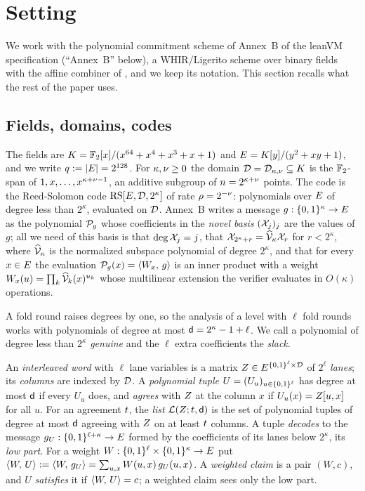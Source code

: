 \section{Setting}\label{sec:setting}

We work with the polynomial commitment scheme of Annex~B of the leanVM specification \cite{leanvm} (``Annex~B'' below), a WHIR/Ligerito scheme \cite{ACFY25,NA25} over binary fields with the affine combiner of \cite{CWYZ26}, and we keep its notation. This section recalls what the rest of the paper uses.

\subsection{Fields, domains, codes}\label{sec:fields}

The fields are $K=\mathbb{F}_2[x]/(x^{64}+x^4+x^3+x+1)$ and $E=K[y]/(y^2+xy+1)$, and we write $q:=|E|=2^{128}$. For $\kappa,\nu\ge0$ the domain $\mathcal{D}=\mathcal{D}_{\kappa,\nu}\subseteq K$ is the $\mathbb{F}_2$-span of $1,x,\dots,x^{\kappa+\nu-1}$, an additive subgroup of $n=2^{\kappa+\nu}$ points. The code is the Reed-Solomon code $\mathrm{RS}[E,\mathcal{D},2^\kappa]$ of rate $\rho=2^{-\nu}$: polynomials over $E$ of degree less than $2^\kappa$, evaluated on $\mathcal{D}$. Annex~B writes a message $g:\{0,1\}^{\kappa}\to E$ as the polynomial $\mathcal{P}_g$ whose coefficients in the \emph{novel basis} $(\mathcal{X}_j)_j$ are the values of $g$; all we need of this basis is that $\deg\mathcal{X}_j=j$, that $\mathcal{X}_{2^\kappa+r}=\widehat{\mathcal{V}}_{\kappa}\mathcal{X}_r$ for $r<2^\kappa$, where $\widehat{\mathcal{V}}_{\kappa}$ is the normalized subspace polynomial of degree $2^\kappa$, and that for every $x\in E$ the evaluation $\mathcal{P}_g(x)=\langle W_x,\, g \rangle$ is an inner product with a weight $W_x(u)=\prod_k\widehat{\mathcal{V}}_{k}(x)^{u_k}$ whose multilinear extension the verifier evaluates in $O(\kappa)$ operations.

A fold round raises degrees by one, so the analysis of a level with $\ell$ fold rounds works with polynomials of degree at most $\mathsf{d}=2^\kappa-1+\ell$. We call a polynomial of degree less than $2^\kappa$ \emph{genuine} and the $\ell$ extra coefficients the \emph{slack}.

\begin{definition}\label{def:lists}
An \emph{interleaved word} with $\ell$ lane variables is a matrix $Z\in E^{\{0,1\}^{\ell}\times\mathcal{D}}$ of $2^\ell$ \emph{lanes}; its \emph{columns} are indexed by $\mathcal{D}$. A \emph{polynomial tuple} $U=(U_u)_{u\in\{0,1\}^{\ell}}$ has degree at most $\mathsf{d}$ if every $U_u$ does, and \emph{agrees} with $Z$ at the column $x$ if $U_u(x)=Z[u,x]$ for all $u$. For an agreement $t$, the \emph{list} $\mathcal{L}(Z;t,\mathsf{d})$ is the set of polynomial tuples of degree at most $\mathsf{d}$ agreeing with $Z$ on at least $t$ columns. A tuple \emph{decodes} to the message $g_U:\{0,1\}^{\ell+\kappa}\to E$ formed by the coefficients of its lanes below $2^\kappa$, its \emph{low part}. For a weight $W:\{0,1\}^{\ell}\times\{0,1\}^{\kappa}\to E$ put $\langle W,\, U \rangle:=\langle W,\, g_U \rangle=\sum_{u,x}W(u,x)\,g_U(u,x)$. A \emph{weighted claim} is a pair $(W,c)$, and $U$ \emph{satisfies} it if $\langle W,\, U \rangle=c$; a weighted claim sees only the low part.
\end{definition}


